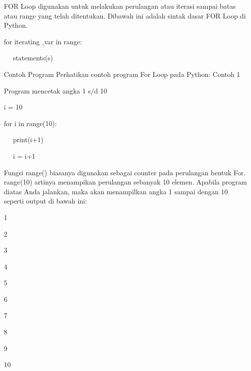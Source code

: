 FOR Loop digunakan untuk melakukan perulangan atau iterasi sampai batas atau range yang telah ditentukan.\vspace{\baselineskip}
\vspace{\baselineskip}
Dibawah ini adalah sintak dasar FOR Loop di Python.\vspace{\baselineskip}
\vspace{\baselineskip}
 \par
for iterating $  \_  $var in range: \par
~~ statements(s) \par
\vspace{\baselineskip}
Contoh Program\vspace{\baselineskip}
\vspace{\baselineskip}
Perhatikan contoh program For Loop pada Python:\vspace{\baselineskip}
\vspace{\baselineskip}
Contoh 1\vspace{\baselineskip}
\vspace{\baselineskip}
 \par
Program mencetak angka 1 s/d 10 \par
\vspace{12pt}
i = 10 \par
for i in range(10): \par
~~ print(i+1) \par
~~ i = i+1 \par
\vspace{\baselineskip}
Fungsi $  $range() $  $biasanya digunakan sebagai counter pada perulangan bentuk For. range(10) artinya menampikan perulangan sebanyak 10 elemen.\vspace{\baselineskip}
\vspace{\baselineskip}
Apabila program diatas Anda jalankan, maka akan menampilkan angka 1 sampai dengan 10 seperti output di bawah ini:\vspace{\baselineskip}
\vspace{\baselineskip}
 \par
1 \par
2 \par
3 \par
4 \par
5 \par
6 \par
7 \par
8 \par
9 \par
10 \par
